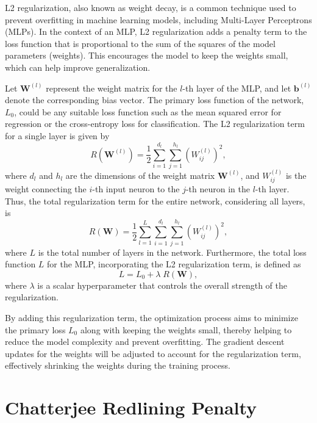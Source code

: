 L2 regularization, also known as weight decay, is a common technique used to prevent overfitting in machine learning models, including Multi-Layer Perceptrons (MLPs). In the context of an MLP, L2 regularization adds a penalty term to the loss function that is proportional to the sum of the squares of the model parameters (weights). This encourages the model to keep the weights small, which can help improve generalization.

Let $\mathbf{W}^{(l)}$ represent the weight matrix for the $l$-th layer of the MLP, and let $\mathbf{b}^{(l)}$ denote the corresponding bias vector. The primary loss function of the network, $L_0$, could be any suitable loss function such as the mean squared error for regression or the cross-entropy loss for classification. The L2 regularization term for a single layer is given by
\begin{equation}
R(\mathbf{W}^{(l)}) = \frac{1}{2} \sum_{i=1}^{d_l} \sum_{j=1}^{h_l} \left( W^{(l)}_{ij} \right)^2,
\end{equation}
where $d_l$ and $h_l$ are the dimensions of the weight matrix $\mathbf{W}^{(l)}$, and $W^{(l)}_{ij}$ is the weight connecting the $i$-th input neuron to the $j$-th neuron in the $l$-th layer. Thus, the total regularization term for the entire network, considering all layers, is
\begin{equation}
R(\mathbf{W}) = \frac{1}{2} \sum_{l=1}^{L} \sum_{i=1}^{d_l} \sum_{j=1}^{h_l} \left( W^{(l)}_{ij} \right)^2,
\end{equation}
where $L$ is the total number of layers in the network. Furthermore, the total loss function $L$ for the MLP, incorporating the L2 regularization term, is defined as
\begin{equation}
L = L_0 + \lambda \; R(\mathbf{W}),
\end{equation}
where $\lambda$ is a scalar hyperparameter that controls the overall strength of the regularization.

By adding this regularization term, the optimization process aims to minimize the primary loss $L_0$ along with keeping the weights small, thereby helping to reduce the model complexity and prevent overfitting. The gradient descent updates for the weights will be adjusted to account for the regularization term, effectively shrinking the weights during the training process.

\section{Chatterjee Redlining Penalty}

